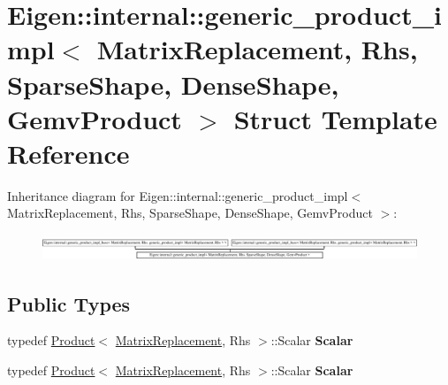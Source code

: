 \hypertarget{struct_eigen_1_1internal_1_1generic__product__impl_3_01_matrix_replacement_00_01_rhs_00_01_spars44a334490feb2d22de510ceb99173cfe}{}\section{Eigen\+:\+:internal\+:\+:generic\+\_\+product\+\_\+impl$<$ Matrix\+Replacement, Rhs, Sparse\+Shape, Dense\+Shape, Gemv\+Product $>$ Struct Template Reference}
\label{struct_eigen_1_1internal_1_1generic__product__impl_3_01_matrix_replacement_00_01_rhs_00_01_spars44a334490feb2d22de510ceb99173cfe}
Inheritance diagram for Eigen\+:\+:internal\+:\+:generic\+\_\+product\+\_\+impl$<$ Matrix\+Replacement, Rhs, Sparse\+Shape, Dense\+Shape, Gemv\+Product $>$\+:\begin{figure}[H]
\begin{center}
\leavevmode
\includegraphics[height=0.783217cm]{struct_eigen_1_1internal_1_1generic__product__impl_3_01_matrix_replacement_00_01_rhs_00_01_spars44a334490feb2d22de510ceb99173cfe}
\end{center}
\end{figure}
\subsection*{Public Types}
\begin{DoxyCompactItemize}
\item 
\mbox{\label{struct_eigen_1_1internal_1_1generic__product__impl_3_01_matrix_replacement_00_01_rhs_00_01_spars44a334490feb2d22de510ceb99173cfe_a0269fc03b2cea22598b05c54d5d1059f}} 
typedef \hyperlink{group___core___module_class_eigen_1_1_product}{Product}$<$ \hyperlink{class_matrix_replacement}{Matrix\+Replacement}, Rhs $>$\+::Scalar {\bfseries Scalar}
\item 
\mbox{\label{struct_eigen_1_1internal_1_1generic__product__impl_3_01_matrix_replacement_00_01_rhs_00_01_spars44a334490feb2d22de510ceb99173cfe_a0269fc03b2cea22598b05c54d5d1059f}} 
typedef \hyperlink{group___core___module_class_eigen_1_1_product}{Product}$<$ \hyperlink{class_matrix_replacement}{Matrix\+Replacement}, Rhs $>$\+::Scalar {\bfseries Scalar}
\end{DoxyCompactItemize}
